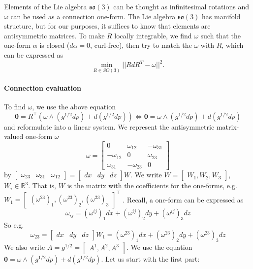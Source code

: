 \documentclass[../thesis.tex]{subfiles}
\begin{document}
Elements of the Lie algebra $\mathfrak{so}(3)$ can be thought as infinitesimal rotations and $\omega$ can be used
as a connection one-form. The Lie algebra $\mathfrak{so}(3)$ has manifold structure, but for our purposes, it suffices to know that elements are antisymmetric matrices.
To make $R$ locally integrable, we find $\omega$ such that the one-form $\alpha$ is closed ($d\alpha = 0$, curl-free),
then try to match the $\omega$ with $R$, which can be expressed as
$$\min_{R\in SO(3)} ||RdR^T - \omega ||^2.$$

\paragraph{Connection evaluation}
To find $\omega$, we use the above equation
$$ \bm{0} = R^{\top}(\omega \wedge (g^{1/2}dp)+ d(g^{1/2}dp)) \iff \bm{0} = \omega \wedge (g^{1/2}dp)+ d(g^{1/2}dp)$$
and reformulate into a linear system.
We represent the antisymmetric matrix-valued one-form $\omega$
$$\omega = \begin{bmatrix}
 0 & \omega_{12} & -\omega_{31} \\
 -\omega_{12} & 0 & \omega_{23} \\
 \omega_{31} & -\omega_{23} & 0
\end{bmatrix}$$
by $
\begin{bmatrix}
  \omega_{23} & \omega_{31} & \omega_{12}
\end{bmatrix} = 
\begin{bmatrix}
  dx & dy & dz
\end{bmatrix} W$. We write $W=\begin{bmatrix}
  W_1,W_2,W_3
\end{bmatrix}$, $W_i \in \mathbb{R}^3$. That is, $W$ is the matrix with the coefficients for the one-forms, e.g.
$W_1 = \begin{bmatrix}
  (\omega^{23})_1, (\omega^{23})_2, (\omega^{23})_3
\end{bmatrix}^{\top}$
.
Recall, a one-form can be expressed as
$$
\omega_{ij}= (\omega^{ij})_1dx + (\omega^{ij})_2dy + (\omega^{ij})_3dz
$$
So e.g. $$\omega_{23} = \begin{bmatrix}
  dx & dy & dz
\end{bmatrix}W_1 = (\omega^{23})_1dx + (\omega^{23})_2dy + (\omega^{23})_3dz$$
We also write $A = g^{1/2}= \begin{bmatrix}
  A^1, A^2, A^3
\end{bmatrix}$.
We use the equation $\bm{0} = \omega \wedge (g^{1/2}dp)+ d(g^{1/2}dp)$.
Let us start with the first part:
\end{document}
